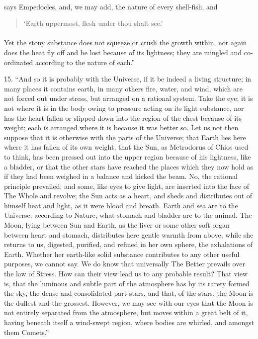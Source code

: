 \documentclass[a4paper, 11pt, oneside, polutonikogreek, english]{article}
\begin{document}
 \paragraph{}
says Empedocles, and, we may add, the nature of every shell-fish, and
\begin{quotation}
`Earth uppermost, flesh under thou shalt see.'
\end{quotation}
\paragraph{}
Yet the stony substance does not squeeze or crush the growth within, nor again does the heat fly off and be lost because of its lightness; they are mingled and co-ordinated according to the nature of each.''

15. ``And so it is probably with the Universe, if it be indeed a living structure; in many places it contains earth, in many others fire, water, and wind, which are not forced out under stress, but arranged on a rational system. Take the eye; it is not where it is in the body owing to pressure acting on its light substance, nor has the heart fallen or slipped down into the region of the chest because of its weight; each is arranged where it is because it was better so. Let us not then suppose that it is otherwise with the parts of the Universe; that Earth lies here where it has fallen of its own weight, that the Sun, as Metrodorus of Chios used to think, has been pressed out into the upper region because of his lightness, like a bladder, or that the other stars have reached the places which they now hold as if they had been weighed in a balance and kicked the beam. No, the rational principle prevailed; and some, like eyes to give light, are inserted into the face of The Whole and revolve; the Sun acts as a heart, and sheds and distributes out of himself heat and light, as it were blood and breath. Earth and sea are to the Universe, according to Nature, what stomach and bladder are to the animal. The Moon, lying between Sun and Earth, as the liver or some other soft organ between heart and stomach, distributes here gentle warmth from above, while she returns to us, digested, purified, and refined in her own sphere, the exhalations of Earth. Whether her earth-like solid substance contributes to any other useful purposes, we cannot say. We do know that universally The Better prevails over the law of Stress. How can their view lead us to any probable result? That view is, that the luminous and subtle part of the atmosphere has by its rarety formed the sky, the dense and consolidated part stars, and that, of the stars, the Moon is the dullest and the grossest. However, we may see with our eyes that the Moon is not entirely separated from the atmosphere, but moves within a great belt of it, having beneath itself a wind-swept region, where bodies are whirled, and amongst them Comets.''
\end{document}
